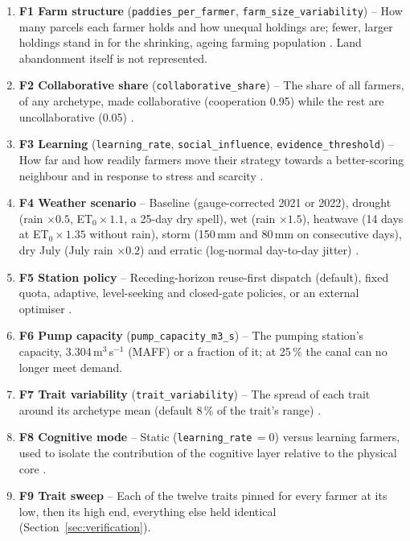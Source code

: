 \documentclass{article}
\begin{document}
\begin{changed}
\begin{enumerate}
    \item \textbf{F1 Farm structure} (\texttt{paddies\_per\_farmer}, \texttt{farm\_size\_variability}) -- How many parcels each farmer holds and how unequal holdings are; fewer, larger holdings stand in for the shrinking, ageing farming population \cite{OkuraBudiasaKato2022}. Land abandonment itself is not represented.
    \item \textbf{F2 Collaborative share} (\texttt{collaborative\_share}) -- The share of all farmers, of any archetype, made collaborative (cooperation 0.95) while the rest are uncollaborative (0.05) \cite{Cao2017, OkuraBudiasaKato2022}.
    \item \textbf{F3 Learning} (\texttt{learning\_rate}, \texttt{social\_influence}, \texttt{evidence\_threshold}) -- How far and how readily farmers move their strategy towards a better-scoring neighbour and in response to stress and scarcity \cite{Alam2022, Wens2021}.
    \item \textbf{F4 Weather scenario} -- Baseline (gauge-corrected 2021 or 2022), drought (rain $\times0.5$, ET$_0\times1.1$, a 25-day dry spell), wet (rain $\times1.5$), heatwave (14 days at ET$_0\times1.35$ without rain), storm (150\,mm and 80\,mm on consecutive days), dry July (July rain $\times0.2$) and erratic (log-normal day-to-day jitter) \cite{Okura2025WaterBalance, Brown2012DecisionScaling}.
    \item \textbf{F5 Station policy} -- Receding-horizon reuse-first dispatch (default), fixed quota, adaptive, level-seeking and closed-gate policies, or an external optimiser \cite{Bahrami2022, Hyun2019, Agyeman2024}.
    \item \textbf{F6 Pump capacity} (\texttt{pump\_capacity\_m3\_s}) -- The pumping station's capacity, 3.304\,m$^3$\,s$^{-1}$ (MAFF) or a fraction of it; at 25\,\% the canal can no longer meet demand.
    \item \textbf{F7 Trait variability} (\texttt{trait\_variability}) -- The spread of each trait around its archetype mean (default 8\,\% of the trait's range) \cite{Alam2022, Wens2021}.
    \item \textbf{F8 Cognitive mode} -- Static (\texttt{learning\_rate}\,$=0$) versus learning farmers, used to isolate the contribution of the cognitive layer relative to the physical core \cite{Tao2019DigitalTwin, Rasheed2020DigitalTwin}.
    \item \textbf{F9 Trait sweep} -- Each of the twelve traits pinned for every farmer at its low, then its high end, everything else held identical (Section~\ref{sec:verification}).
\end{enumerate}
\end{changed}
\end{document}
